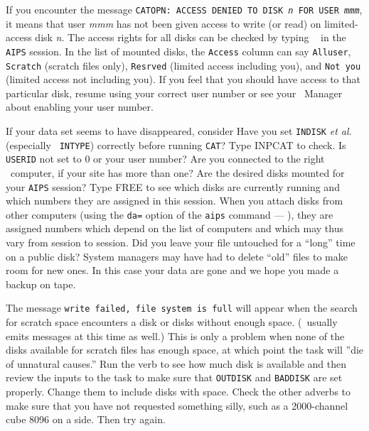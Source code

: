 
     If you encounter the message {\tt CATOPN: ACCESS DENIED TO DISK
{\it n\/} FOR USER {\it mmm\/}}, it means that user {\it mmm\/} has
not been given access to write (or read) on limited-access disk {\it
n\/}.  The access rights for all disks can be checked by typing {\tt
{}} in the {\tt AIPS} session.  In the list of mounted
disks, the {\tt Access} column can say {\tt Alluser}, {\tt Scratch}
(scratch files only), {\tt Resrved} (limited access including you),
and {\tt Not you} (limited access not including you).  If you feel
that you should have access to that particular disk, resume using
your correct user number or see your \AIPS\ Manager about enabling
your user number.

     If your data set seems to have disappeared, consider
\xben
\Item Have you set {\tt INDISK} {\it et al.} (especially {\tt
       INTYPE}) correctly before running {\tt CAT}\@?  Type {\us
       INP\qs CAT \CR} to check.  Is {\tt USERID} not set to 0 or your
       user number?
\Item Are you connected to the right \AIPS\ computer, if your
       site has more than one?
\Item Are the desired disks mounted for your {\tt AIPS} session?
       Type {\us FREE \CR} to see which disks are currently running
       and which numbers they are assigned in this session.  When you
       attach disks from other computers (using the {\tt da=} option
       of the {\tt aips} command --- ), they are assigned
       numbers which depend on the list of computers and which may
       thus vary from session to session.
\Item Did you leave your file untouched for a ``long'' time on a
       public disk?  System managers may have had to delete ``old''
       files to make room for new ones.  In this case your data are
       gone and we hope you made a backup on tape.
\xeen

     The message {\tt write failed, file system is full} will appear
when the search for scratch space encounters a disk or disks without
enough space.  (\AIPS\ usually emits messages at this time as well.)
This is only a problem when none of the disks available for scratch
files has enough space, at which point the task will ''die of
unnatural causes.''  Run the verb {\tt {}} to see how
much disk is available and then review the inputs to the task to make
sure that {\tt OUTDISK} and {\tt BADDISK} are set properly.  Change
them to include disks with space.  Check the other adverbs to make
sure that you have not requested something silly, such as a
2000-channel cube 8096 on a side.  Then try again.

